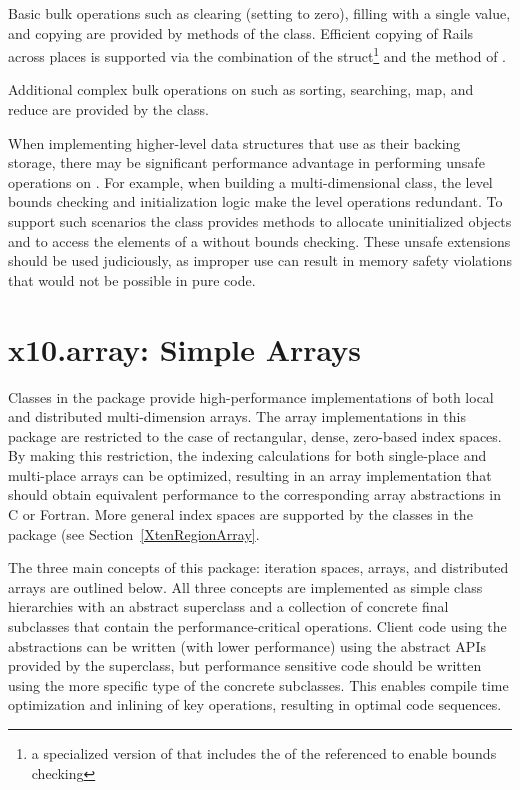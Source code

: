 Basic bulk operations such as clearing (setting to zero), filling with
a single value, and copying are provided by methods of the 
class.  Efficient copying of Rails across places is supported via the
combination of the  struct\footnote{a specialized
  version of  that includes the  of the
  referenced  to enable bounds checking} and the
 method of . 

Additional complex bulk operations on  such as sorting,
searching, map, and reduce are provided by the
 class.

When implementing higher-level data structures that use  as
their backing storage, there may be significant performance advantage
in performing unsafe operations on .  For example, when
building a multi-dimensional  class, the  level
bounds checking and initialization logic make the  level
operations redundant. To support such scenarios the class
 provides methods to allocate uninitialized
 objects and to access the elements of a  without
bounds checking.  These unsafe extensions should be used judiciously,
as improper use can result in memory safety violations that would not
be possible in pure \Xten{} code. 

\section{x10.array: Simple Arrays}\label{XtenSimpleArray}

Classes in the  package provide high-performance
implementations of both local and distributed multi-dimension arrays.
The array implementations in this package are restricted to the case
of rectangular, dense, zero-based index spaces.  By making this
restriction, the indexing calculations for both single-place and
multi-place arrays can be optimized, resulting in an array
implementation that should obtain equivalent performance to the
corresponding array abstractions in C or Fortran. More general index
spaces are supported by the classes in the 
package (see Section~\ref{XtenRegionArray}.

The three main concepts of this package: iteration spaces, arrays, and
distributed arrays are outlined below.  All three concepts are
implemented as simple class hierarchies with an abstract superclass
and a collection of concrete final subclasses that contain the
performance-critical operations.  Client code using the abstractions
can be written (with lower performance) using the abstract APIs
provided by the superclass, but performance sensitive code should be
written using the more specific type of the concrete subclasses.  This
enables compile time optimization and inlining of key operations,
resulting in optimal code sequences.

